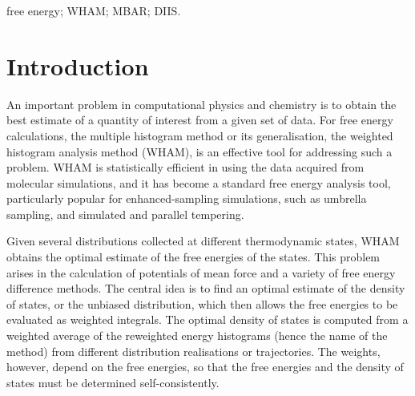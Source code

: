 \documentclass{gMOS2e}
\begin{document}
\begin{keywords}
free energy;
WHAM;
MBAR;
DIIS.
\end{keywords}





\section{Introduction}





An important problem in computational physics and chemistry
is to obtain the best estimate of a quantity of interest
from a given set of data\cite{
shirts2008}.
%
For free energy calculations,
the multiple histogram method\cite{
ferrenberg1988, ferrenberg1989,
newman, frenkel}
or its generalisation,
the weighted histogram analysis method (WHAM)\cite{
kumar1992, roux1995,
bartels1997, gallicchio2005, habeck2007, habeck2012,
souaille2001,
chodera2007, shirts2008, bereau2009,
hub2010, zhu2012},
is an effective tool for
addressing such a problem.
%
WHAM is statistically efficient in using the data
acquired from molecular simulations,
and it has become
a standard free energy analysis tool,
particularly popular
for enhanced-sampling simulations,
such as umbrella sampling\cite{
torrie1974, laio2002},
and simulated\cite{
marinari1992, lyubartsev1992}
and parallel\cite{
swendsen1986, geyer1991, hukushima1996, hansmann1997, earl2005}
tempering.




Given several distributions collected
at different thermodynamic states,
WHAM obtains the optimal estimate
of the free energies of the states.
%
This problem arises in the calculation of potentials of mean force and a variety of free energy difference methods.
%
The central idea  is to find an optimal estimate
of the density of states,
or the unbiased distribution,
which then allows
the free energies to be evaluated
as weighted integrals.
%
The optimal density of states
is computed from a weighted average
of the reweighted energy histograms
(hence the name of the method)
from different distribution realisations or trajectories.
%
The weights, however,
depend on the free energies,
so that
the free energies
and the density of states
must be determined self-consistently.
\end{document}
